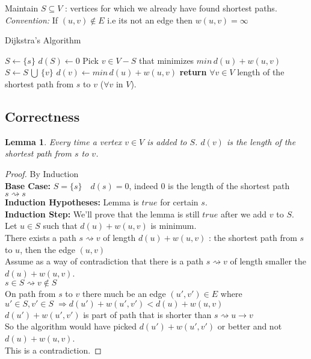 \documentclass{article}
\theoremstyle{definition}
\theoremstyle{remark}
\theoremstyle{plain}
\newtheorem{lem}[thm]{Lemma}
\begin{document}
Maintain $S \subseteq V$ : vertices for which we already have found shortest paths.
\textsl{Convention:}  If $(u,v) \notin E$ i.e its not an edge then $w(u,v) = \infty$

\begin{algorithm}
\caption{Dijkstra's Algorithm}\label{Dijkstra's Algorithm to find the shortest paths}
\begin{algorithmic}[1]
	\State $S \gets \{ s \}$
	\State $d(S) \gets 0$
	\Repeat
		\State Pick $v \in V - S$ that minimizes $min\,d(u) + w(u,v)$
		\State $S \gets S \, \bigcup \, \{ v \}$
		\State $d(v) \gets min\,d(u) + w(u,v)$
	\State \textbf{return} $\forall v \in V$ length of the shortest path from $s$ to $v$ ($\forall v $ in $V$).
	\EndProcedure
\end{algorithmic}
\end{algorithm}

\subsection{Correctness}

\begin{lem}
Every time a vertex $v \in V$ is added to $S$. $d(v)$ is the length of the shortest path from $s$ to $v$.
\end{lem}

\begin{proof} By Induction\\
\textbf{Base Case:} $S = \{ s \} \quad d(s) = 0$, indeed $0$ is the length of the shortest path $s  \rightsquigarrow s$\\
\textbf{Induction Hypotheses:} Lemma is $true$ for certain $s$.\\
\textbf{Induction Step:} We'll prove that the lemma is still $true$ after we add $v$ to $S$.\\
Let $u \in S$ such that $d(u) + w(u,v)$ is minimum.\\
There exists  a path $s  \rightsquigarrow v$ of length $d(u) + w(u,v)$ : the shortest path from $s$ to $u$, then the edge $(u,v)$\\
Assume as a way of contradiction that there is a path  $s  \rightsquigarrow v$ of length smaller the $d(u) + w(u,v)$. \\

$s  \in S \rightsquigarrow v \notin S$ \\
On path from $s$ to $v$ there much be an edge $(u',v') \in E$ where $u' \in S, v' \in S\;  \Rightarrow d(u') + w(u',v') < d(u) + w(u,v)$\\
$d(u') + w(u',v')$ is part of path that is shorter than $s  \rightsquigarrow u \rightarrow v$\\
So the algorithm would have picked $d(u') + w(u',v')$ or better and not $d(u) + w(u,v)$.\\
This is a contradiction.
\end{proof}
\end{document}
